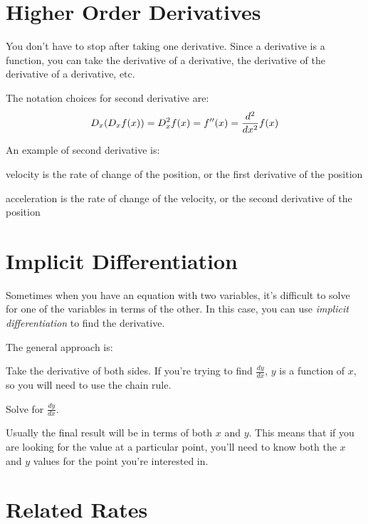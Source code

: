 \documentclass[fleqn]{exam}
\begin{document}
\section{Higher Order Derivatives}
You don't have to stop after taking one derivative.  Since a derivative is a function, you can take the derivative of a
derivative, the derivative of the derivative of a derivative, etc.  

The notation choices for second derivative are:
\[
  D_x (D_x f(x)) = D_x^2 f(x) = f''(x) = \frac{d^2}{dx^2} f(x) \\
\]

An example of second derivative is:
\begin{itemize*}
  \item velocity is the rate of change of the position, or the first derivative of the position
  \item acceleration is the rate of change of the velocity, or the second derivative of the position
\end{itemize*}

\section{Implicit Differentiation}

Sometimes when you have an equation with two variables, it's difficult to solve for one of the variables in terms of the
other.  In this case, you can use {\em implicit differentiation} to find the derivative.  

The general approach is:
\begin{enumerate*}
  \item Take the derivative of both sides.  If you're trying to find $\frac{dy}{dx}$, $y$ is a function of $x$, so you
    will need to use the chain rule.
  \item Solve for $\frac{dy}{dx}$.
\end{enumerate*}

Usually the final result will be in terms of both $x$ and $y$.  This means that if you are looking for the value at a
particular point, you'll need to know both the $x$ and $y$ values for the point you're interested in.

\section{Related Rates}
\label{related-rates}
\end{document}
